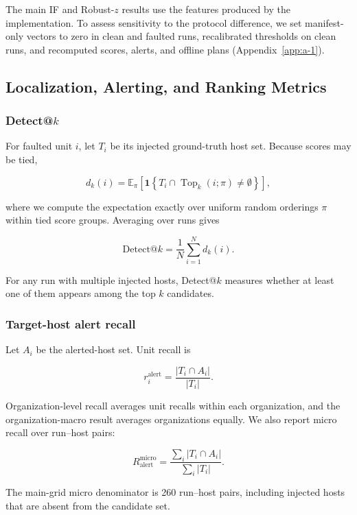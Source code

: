 \documentclass[sn-basic]{sn-jnl}%
\theoremstyle{thmstyleone}%
\theoremstyle{thmstyletwo}%
\theoremstyle{thmstylethree}%
\begin{document}
The main IF and Robust-\(z\) results use the features produced by the implementation. To assess sensitivity to the protocol difference, we set manifest-only vectors to zero in clean and faulted runs, recalibrated thresholds on clean runs, and recomputed scores, alerts, and offline plans (Appendix~\ref{app:a-1}).

\subsection{Localization, Alerting, and Ranking Metrics}\label{sec:ranking-metrics}

\subsubsection{Detect@\texorpdfstring{\(k\)}{k}}

For faulted unit \(i\), let \(T_i\) be its injected ground-truth host set. Because scores may be tied,

\[
d_k(i)=\mathbb{E}_{\pi}\!\left[\mathbf{1}\!\left\{T_i\cap\operatorname{Top}_k(i;\pi)\ne\emptyset\right\}\right],
\]

where we compute the expectation exactly over uniform random orderings \(\pi\) within tied score groups. Averaging over runs gives

\[
\mathrm{Detect}@k=\frac{1}{N}\sum_{i=1}^{N}d_k(i).
\]

For any run with multiple injected hosts, Detect@\(k\) measures whether at least one of them appears among the top \(k\) candidates.

\subsubsection{Target-host alert recall}

Let \(A_i\) be the alerted-host set. Unit recall is

\[
r_i^{\mathrm{alert}}=\frac{\lvert T_i\cap A_i\rvert}{\lvert T_i\rvert}.
\]

Organization-level recall averages unit recalls within each organization, and the organization-macro result averages organizations equally. We also report micro recall over run--host pairs:

\[
R_{\mathrm{alert}}^{\mathrm{micro}}=\frac{\sum_i\lvert T_i\cap A_i\rvert}{\sum_i\lvert T_i\rvert}.
\]

The main-grid micro denominator is 260 run--host pairs, including injected hosts that are absent from the candidate set.
\end{document}
